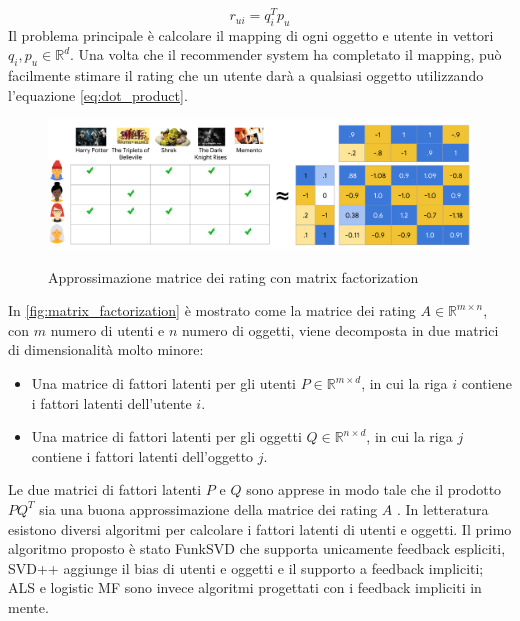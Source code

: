 \documentclass[12pt,italian]{report}
\begin{document}
\begin{equation} \label{eq:dot_product}
r_{ui} = q_i^Tp_u
\end{equation}
Il problema principale è calcolare il mapping di ogni oggetto e utente in vettori $q_i, p_u \in \mathbb{R}^d$. Una volta che il recommender system ha completato il mapping, può facilmente stimare il rating che un utente darà a qualsiasi oggetto utilizzando l'equazione \ref{eq:dot_product}. 

\begin{figure}
  \centering
  \includegraphics[width=\linewidth]{immagini/matrix_factorization.pdf}
  \caption{Approssimazione matrice dei rating con matrix factorization}
  \cite{mf-google}
  \label{fig:matrix_factorization}
\end{figure}

In \autoref{fig:matrix_factorization} è mostrato come la matrice dei rating $A \in \mathbb{R}^{m \times n}$, con $m$ numero di utenti e $n$ numero di oggetti, viene decomposta in due matrici di dimensionalità molto minore:

\begin{itemize}
	\item Una matrice di fattori latenti per gli utenti $P \in \mathbb{R}^{m \times d}$, in cui la riga $i$ contiene i fattori latenti dell'utente $i$.
	\item Una matrice di fattori latenti per gli oggetti $Q \in \mathbb{R}^{n \times d}$, in cui la riga $j$ contiene i fattori latenti dell'oggetto $j$.
\end{itemize}
Le due matrici di fattori latenti $P$ e $Q$ sono apprese in modo tale che il prodotto $PQ^T$ sia una buona approssimazione della matrice dei rating $A$ \cite{mf-google}. In letteratura esistono diversi algoritmi per calcolare i fattori latenti di utenti e oggetti. Il primo algoritmo proposto è stato FunkSVD \cite{funk-mf} che supporta unicamente feedback espliciti, SVD++ \cite{svd++} aggiunge il bias di utenti e oggetti e il supporto a feedback impliciti; ALS \cite{als} e logistic MF \cite{logistic-mf} sono invece algoritmi progettati con i feedback impliciti in mente.
\end{document}
